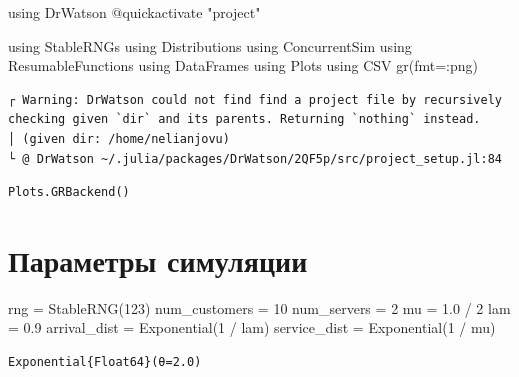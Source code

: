 \documentclass[
  12pt,
  a4paper,
  DIV=11,
  numbers=noendperiod]{scrreprt}
\newenvironment{Shaded}{\begin{snugshade}}{\end{snugshade}}
\newcommand{\BuiltInTok}[1]{\textcolor[rgb]{0.00,0.23,0.31}{#1}}
\newcommand{\FloatTok}[1]{\textcolor[rgb]{0.68,0.00,0.00}{#1}}
\newcommand{\FunctionTok}[1]{\textcolor[rgb]{0.28,0.35,0.67}{#1}}
\newcommand{\ImportTok}[1]{\textcolor[rgb]{0.00,0.46,0.62}{#1}}
\newcommand{\NormalTok}[1]{\textcolor[rgb]{0.00,0.23,0.31}{#1}}
\newcommand{\OperatorTok}[1]{\textcolor[rgb]{0.37,0.37,0.37}{#1}}
\newcommand{\PreprocessorTok}[1]{\textcolor[rgb]{0.68,0.00,0.00}{#1}}
\newcommand{\StringTok}[1]{\textcolor[rgb]{0.13,0.47,0.30}{#1}}
\begin{document}
\begin{Shaded}
\begin{Highlighting}[]
\ImportTok{using} \BuiltInTok{DrWatson}
\PreprocessorTok{@quickactivate} \StringTok{"project"}

\ImportTok{using} \BuiltInTok{StableRNGs}
\ImportTok{using} \BuiltInTok{Distributions}
\ImportTok{using} \BuiltInTok{ConcurrentSim}
\ImportTok{using} \BuiltInTok{ResumableFunctions}
\ImportTok{using} \BuiltInTok{DataFrames}
\ImportTok{using} \BuiltInTok{Plots}
\ImportTok{using} \BuiltInTok{CSV}
\FunctionTok{gr}\NormalTok{(fmt}\OperatorTok{=:}\NormalTok{png)}
\end{Highlighting}
\end{Shaded}

\begin{verbatim}
┌ Warning: DrWatson could not find find a project file by recursively checking given `dir` and its parents. Returning `nothing` instead.
│ (given dir: /home/nelianjovu)
└ @ DrWatson ~/.julia/packages/DrWatson/2QF5p/src/project_setup.jl:84
\end{verbatim}

\begin{verbatim}
Plots.GRBackend()
\end{verbatim}

\section{Параметры
симуляции}\label{ux43fux430ux440ux430ux43cux435ux442ux440ux44b-ux441ux438ux43cux443ux43bux44fux446ux438ux438}

\begin{Shaded}
\begin{Highlighting}[]
\NormalTok{rng }\OperatorTok{=} \FunctionTok{StableRNG}\NormalTok{(}\FloatTok{123}\NormalTok{)}
\NormalTok{num\_customers }\OperatorTok{=} \FloatTok{10}
\NormalTok{num\_servers }\OperatorTok{=} \FloatTok{2}
\NormalTok{mu }\OperatorTok{=} \FloatTok{1.0} \OperatorTok{/} \FloatTok{2}
\NormalTok{lam }\OperatorTok{=} \FloatTok{0.9}
\NormalTok{arrival\_dist }\OperatorTok{=} \FunctionTok{Exponential}\NormalTok{(}\FloatTok{1} \OperatorTok{/}\NormalTok{ lam)}
\NormalTok{service\_dist }\OperatorTok{=} \FunctionTok{Exponential}\NormalTok{(}\FloatTok{1} \OperatorTok{/}\NormalTok{ mu)}
\end{Highlighting}
\end{Shaded}

\begin{verbatim}
Exponential{Float64}(θ=2.0)
\end{verbatim}
\end{document}
